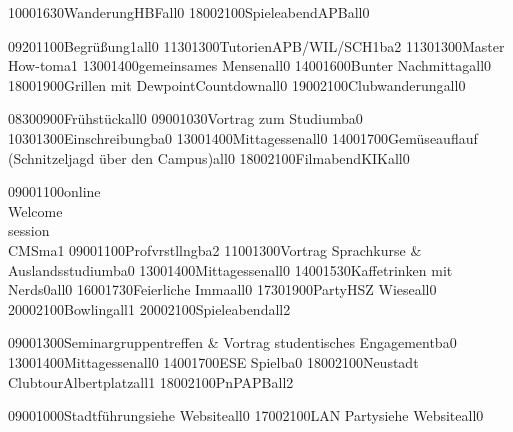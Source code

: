 \documentclass[a5paper,7pt]{scrreprt}
\begin{document}
\thispagestyle{empty}

\setslotsize{3.00cm}{0.25cm}
\settextframe{0.8mm}

\seteventcornerradius{0pt}



\begin{center}
\begin{timetable}
   {1000}{1630}{Wanderung}{}{HBF}{}{all}{0}
   {1800}{2100}{Spieleabend}{}{APB}{}{all}{0}

   {0920}{1100}{Begrüßung}{}{}{1}{all}{0}
   {1130}{1300}{Tutorien}{}{APB/WIL/SCH}{1}{ba}{2}
   {1130}{1300}{Master\\How-to}{}{}{}{ma}{1}
   {1300}{1400}{gemeinsames Mensen}{}{}{}{all}{0}
   {1400}{1600}{Bunter Nachmittag}{}{}{}{all}{0}
   {1800}{1900}{Grillen mit Dewpoint}{}{Countdown}{}{all}{0}
   {1900}{2100}{Clubwanderung}{}{}{}{all}{0}

   {0830}{0900}{Frühstück}{}{}{}{all}{0}
   {0900}{1030}{Vortrag zum Studium}{}{}{}{ba}{0}
   {1030}{1300}{Einschreibung}{}{}{}{ba}{0}
   {1300}{1400}{Mittagessen}{}{}{}{all}{0}
   {1400}{1700}{Gemüseauflauf (Schnitzeljagd über den Campus)}{}{}{}{all}{0}
   {1800}{2100}{Filmabend}{}{KIK}{}{all}{0}


   {0900}{1100}{online\\Welcome\\session\\CMS}{}{}{}{ma}{1}
   {0900}{1100}{Profvrstllng}{}{}{}{ba}{2}
   {1100}{1300}{Vortrag Sprachkurse & Auslandsstudium}{}{}{}{ba}{0}
   {1300}{1400}{Mittagessen}{}{}{}{all}{0}
   {1400}{1530}{Kaffetrinken mit Nerds}{}{}{0}{all}{0}
   {1600}{1730}{Feierliche Imma}{}{}{}{all}{0}
   {1730}{1900}{Party}{}{HSZ Wiese}{}{all}{0}
   {2000}{2100}{Bowling}{}{}{}{all}{1}
   {2000}{2100}{Spieleabend}{}{}{}{all}{2}

   {0900}{1300}{Seminargruppentreffen & Vortrag studentisches Engagement}{}{}{}{ba}{0}
   {1300}{1400}{Mittagessen}{}{}{}{all}{0}
   {1400}{1700}{ESE Spiel}{}{}{}{ba}{0}
   {1800}{2100}{Neustadt\\ Clubtour}{}{Albertplatz}{}{all}{1}
   {1800}{2100}{PnP}{}{APB}{}{all}{2}
  
   {0900}{1000}{Stadtführung}{}{siehe Website}{}{all}{0}
   {1700}{2100}{LAN Party}{}{siehe Website}{}{all}{0}
\end{timetable}
\end{center}
\end{document}
